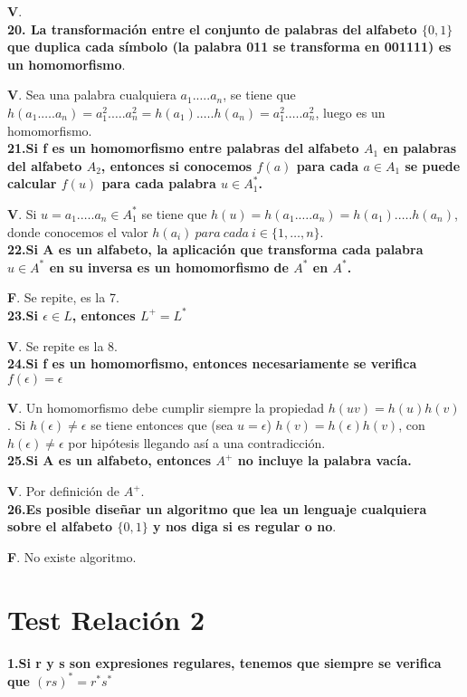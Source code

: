 \documentclass[a4paper,11pt]{article}
\begin{document}
\textbf{V}. \\

\textbf{20. La transformación entre el conjunto de palabras del alfabeto $\{0,1\}$ que duplica cada símbolo (la palabra 011 se transforma en 001111) es un homomorfismo}.

\textbf{V}. Sea una palabra cualquiera $a_1.\ldots.a_n$, se tiene que $h(a_1.\ldots.a_n)=a_1^2.\ldots.a_n^2=h(a_1).\ldots.h(a_n)=a_1^2.\ldots.a_n^2$, luego es un homomorfismo. \\

\textbf{21.Si f es un homomorfismo entre palabras del alfabeto $A_1$ en palabras del alfabeto $A_2$, entonces si conocemos $f(a)$ para cada $a \in A_1$ se puede calcular $f(u)$ para cada palabra $u \in A_1^*$.} 

\textbf{V}. Si $u=a_1.\ldots.a_n \in A_1^*$ se tiene que $h(u)=h(a_1.\ldots.a_n)=h(a_1).\ldots.h(a_n)$, donde conocemos el valor $h(a_i) \> para \> cada \> i\in \{1,\ldots,n\}$. \\

\textbf{22.Si A es un alfabeto, la aplicación que transforma cada palabra $u\in A^*$ en su inversa es un homomorfismo de $A^*$ en $A^*$.}

\textbf{F}. Se repite, es la 7. \\

\textbf{23.Si $\epsilon \in L$, entonces $L^+=L^*$}

\textbf{V}. Se repite es la 8. \\

\textbf{24.Si f es un homomorfismo, entonces necesariamente se verifica $f(\epsilon)=\epsilon$}

\textbf{V}. Un homomorfismo debe cumplir siempre la propiedad $h(uv)=h(u)h(v)$. Si $h(\epsilon)\neq \epsilon$ se tiene entonces que (sea $u=\epsilon$) $h(v)=h(\epsilon)h(v)$, con $h(\epsilon)\neq \epsilon$ por hipótesis llegando así a una contradicción. \\

\textbf{25.Si A es un alfabeto, entonces $A^+$ no incluye la palabra vacía.}

\textbf{V}. Por definición de $A^+$. \\

\textbf{26.Es posible diseñar un algoritmo que lea un lenguaje cualquiera sobre el alfabeto $\{0,1\}$ y nos diga si es regular o no}.

\textbf{F}. No existe algoritmo. 

\section{Test Relación 2}
\textbf{1.Si r y s son expresiones regulares, tenemos que siempre se verifica que $(rs)^*=r^*s^*$}
\end{document}
